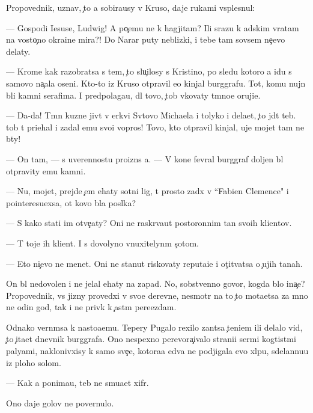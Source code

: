 \documentclass[10pt]{book}
\begin{document}
Propovednik, uznav, {\c}to {\y}a sobira{\y}usy v Kruso, daje rukami vsplesnul:

— Gospodi Iesuse, Ludwig! A po{\c}emu ne k hagjitam? Ili srazu k adskim vratam na vosto{\c}no{\y} okra{\y}ine mira?! Do Narar{\yi} puty neblizki{\y}, i tebe tam sovsem ne{\c}evo delaty.

— Krome kak razobratsa s tem, {\c}to slu{\c}ilosy s Kristino{\y}, po sledu kotoro{\y} {\y}a idu s samovo na{\c}ala oseni. Kto-to iz Kruso otpravil {\y}e{\y}o kinjal burggrafu. Tot, komu nujn{\yi} b{\yi}li kamni serafima. I predpolaga{\y}u, dl{\ia} tovo, {\c}tob{\yi} v{\yi}kovaty t{\e}mno{\y}e oruji{\y}e.

— Da-da! T{\e}mn{\yi}{\y} kuzne{\q} jiv{\e}t v {\q}erkvi Sv{\ia}tovo Michaela i tolyko i dela{\y}et, {\c}to jd{\e}t teb{\ia}. {\C}tob{\yi} t{\yi} pri{\y}ehal i zadal {\y}emu svo{\y}i vopros{\yi}! Tovo, kto otpravil kinjal, uje mojet tam ne b{\yi}ty!

— On tam, — s uverennost{\y}u proizn{\e}s {\y}a. — V kon{\q}e fevral{\ia} burggraf doljen b{\yi}l otpravity {\y}emu kamni.

— Nu, mojet, prejde {\c}em {\y}ehaty sotni lig, t{\yi} prosto za{\y}d{\e}x v ``Fabien Clemence" i pointeresu{\y}exsa, ot kovo b{\yi}la pos{\yi}lka?

— S kako{\y} stati im otve{\c}aty? Oni ne raskr{\yi}va{\y}ut postoronnim ta{\y}n{\yi} svo{\y}ih kli{\y}entov.

— T{\yi} toje ih kli{\y}ent. I s dovolyno vnuxitelyn{\yi}m s{\c}otom.

— Eto ni{\c}evo ne men{\ia}{\y}et. Oni ne stanut riskovaty reputa{\q}i{\y}e{\y} i ot{\c}it{\yi}vatsa o {\c}ujih ta{\y}nah.

On b{\yi}l nedovolen i ne jelal {\y}ehaty na zapad. No, sobstvenno govor{\ia}, kogda b{\yi}lo ina{\c}e? Propovednik, vs{\iu} jizny provedxi{\y} v svo{\y}e{\y} derevne, nesmotr{\ia} na to {\c}to mota{\y}etsa za mno{\y} ne odin god, tak i ne priv{\yi}k k {\c}ast{\yi}m pere{\y}ezdam.

Odnako vern{\e}msa k nasto{\y}a{\x}emu. Tepery Pugalo rexilo zan{\ia}tsa {\c}teni{\y}em ili delalo vid, {\c}to {\c}ita{\y}et dnevnik burggrafa. Ono nespexno perevora{\c}ivalo strani{\q}i ser{\yi}mi kogtist{\yi}mi paly{\q}ami, naklonivxisy k samo{\y} sve{\c}e, kotora{\y}a {\y}edva ne podjigala {\y}evo xl{\ia}pu, sdelannu{\y}u iz ploho{\y} solom{\yi}.

— Kak {\y}a ponima{\y}u, teb{\ia} ne smu{\x}a{\y}et xifr.

Ono daje golov{\yi} ne povernulo.
\end{document}
